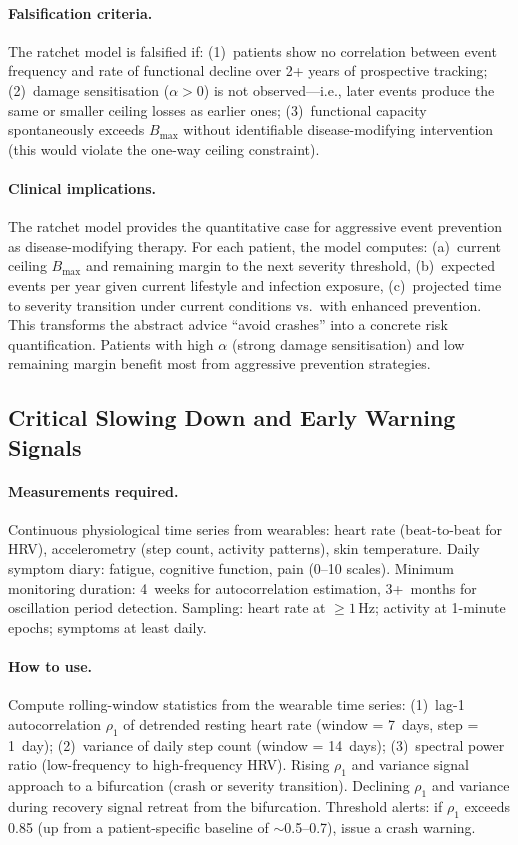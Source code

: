 \paragraph{Falsification criteria.}
The ratchet model is falsified if: (1)~patients show no correlation between event frequency and rate of functional decline over 2+ years of prospective tracking; (2)~damage sensitisation ($\alpha > 0$) is not observed---i.e., later events produce the same or smaller ceiling losses as earlier ones; (3)~functional capacity spontaneously exceeds $B_{\max}$ without identifiable disease-modifying intervention (this would violate the one-way ceiling constraint).

\paragraph{Clinical implications.}
The ratchet model provides the quantitative case for aggressive event prevention as disease-modifying therapy. For each patient, the model computes: (a)~current ceiling $B_{\max}$ and remaining margin to the next severity threshold, (b)~expected events per year given current lifestyle and infection exposure, (c)~projected time to severity transition under current conditions vs.\ with enhanced prevention. This transforms the abstract advice ``avoid crashes'' into a concrete risk quantification. Patients with high $\alpha$ (strong damage sensitisation) and low remaining margin benefit most from aggressive prevention strategies.

\subsection{Critical Slowing Down and Early Warning Signals}

\paragraph{Measurements required.}
Continuous physiological time series from wearables: heart rate (beat-to-beat for HRV), accelerometry (step count, activity patterns), skin temperature. Daily symptom diary: fatigue, cognitive function, pain (0--10 scales). Minimum monitoring duration: 4~weeks for autocorrelation estimation, 3+~months for oscillation period detection. Sampling: heart rate at $\geq 1$\,Hz; activity at 1-minute epochs; symptoms at least daily.

\paragraph{How to use.}
Compute rolling-window statistics from the wearable time series: (1)~lag-1 autocorrelation $\rho_1$ of detrended resting heart rate (window = 7~days, step = 1~day); (2)~variance of daily step count (window = 14~days); (3)~spectral power ratio (low-frequency to high-frequency HRV). Rising $\rho_1$ and variance signal approach to a bifurcation (crash or severity transition). Declining $\rho_1$ and variance during recovery signal retreat from the bifurcation. Threshold alerts: if $\rho_1$ exceeds 0.85 (up from a patient-specific baseline of $\sim$0.5--0.7), issue a crash warning.

